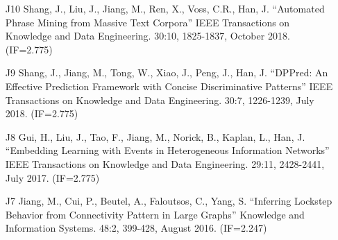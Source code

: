 \documentclass[10pt]{article}
\newenvironment{myindentpar}[1]%
{\begin{list}{}%
         {\setlength{\leftmargin}{#1}}%
         \item[]%
}
{\end{list}}
\newcounter{list}
\begin{document}
\begin{myindentpar}{0.00cm}
\begin{enumerate}[leftmargin=.5cm]
\item[J10] Shang, J., Liu, J., Jiang, M., Ren, X., Voss, C.R., Han, J. ``Automated Phrase Mining from Massive Text Corpora'' IEEE Transactions on Knowledge and Data Engineering. 30:10, 1825-1837, October 2018. (IF=2.775)

\vspace{-0.1cm}

\item[J9] Shang, J., Jiang, M., Tong, W., Xiao, J., Peng, J., Han, J. ``DPPred: An Effective Prediction Framework with Concise Discriminative Patterns'' IEEE Transactions on Knowledge and Data Engineering. 30:7, 1226-1239, July 2018. (IF=2.775)

\vspace{-0.1cm}

\item[J8] Gui, H., Liu, J., Tao, F., Jiang, M., Norick, B., Kaplan, L., Han, J. ``Embedding Learning with Events in Heterogeneous Information Networks'' IEEE Transactions on Knowledge and Data Engineering. 29:11, 2428-2441, July 2017. (IF=2.775)

\vspace{-0.1cm}

\item[J7] Jiang, M., Cui, P., Beutel, A., Faloutsos, C., Yang, S. ``Inferring Lockstep Behavior from Connectivity Pattern in Large Graphs'' Knowledge and Information Systems. 48:2, 399-428, August 2016. (IF=2.247)

\vspace{-0.1cm}


\end{enumerate}
\end{myindentpar}
\end{document}
